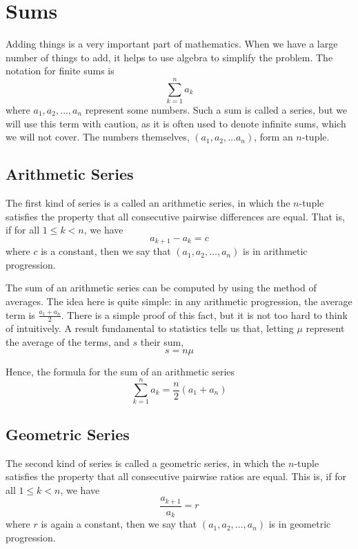 \documentclass[a4paper,10pt]{report}
\begin{document}
\section{Sums}

Adding things is a very important part of mathematics. When we have a large
number of things to add, it helps to use algebra to simplify the problem. The
notation for finite sums is \[
 \sum_{k = 1}^n a_k
\] where $a_1, a_2, \dots, a_n$ represent some numbers. Such a sum is called a
series, but we will use this term with caution, as it is often used to denote
infinite sums, which we will not cover. The numbers themselves, $(a_1, a_2,
\dots a_n)$, form an $n$-tuple.

\subsection{Arithmetic Series}

The first kind of series is a called an arithmetic series, in which the
$n$-tuple satisfies the property that all consecutive pairwise differences are
equal. That is, if for all $1 \le k < n$, we have \[ a_{k+1} - a_k = c \] where
$c$ is a constant, then we say that $(a_1, a_2, \dots, a_n)$ is in arithmetic
progression.

The sum of an arithmetic series can be computed by using the method of averages.
The idea here is quite simple: in any arithmetic progression, the average term
is $\frac{a_1 + a_n}{2}$. There is a simple proof of this fact, but it is not
too hard to think of intuitively. A result fundamental to statistics tells us
that, letting $\mu$ represent the average of the terms, and $s$ their sum, \[
 s = n \mu
\]

Hence, the formula for the sum of an arithmetic series \begin{equation}
 \sum_{k=1}^n a_k = \frac{n}{2} (a_1 + a_n)
\end{equation}

\subsection{Geometric Series}

The second kind of series is called a geometric series, in which the $n$-tuple
satisfies the property that all consecutive pairwise ratios are equal. This is,
if for all $1 \le k < n$, we have \[ \frac{a_{k+1}}{a_k} = r \] where $r$ is
again a constant, then we say that $(a_1, a_2, \dots, a_n)$ is in geometric
progression.
\end{document}
